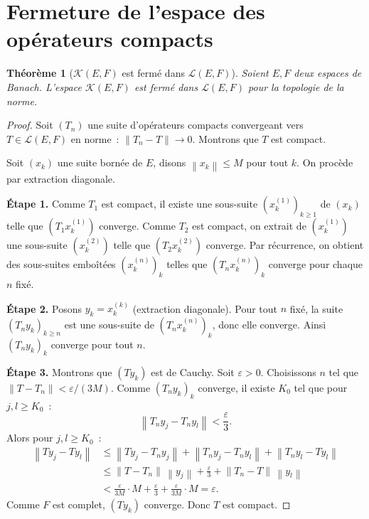 \documentclass[a4paper,12pt]{book}
\newcommand{\norm}[1]{\left\| #1 \right\|}
\theoremstyle{definition}
\theoremstyle{plain}
\newtheorem{theoreme}[definition]{Théorème}
\theoremstyle{remark}
\begin{document}
\section{Fermeture de l'espace des opérateurs compacts}

\begin{theoreme}[{$\mathcal{K}(E,F)$ est fermé dans $\mathcal{L}(E,F)$}]
\label{thm:compact-ferme}
Soient $E, F$ deux espaces de Banach. L'espace $\mathcal{K}(E,F)$ est fermé dans
$\mathcal{L}(E,F)$ pour la topologie de la norme.
\end{theoreme}

\begin{proof}
Soit $(T_n)$ une suite d'opérateurs compacts convergeant vers $T \in \mathcal{L}(E,F)$
en norme~: $\norm{T_n - T} \to 0$. Montrons que $T$ est compact.

Soit $(x_k)$ une suite bornée de $E$, disons $\norm{x_k} \le M$ pour tout $k$. On
procède par extraction diagonale.

\textbf{Étape 1.} Comme $T_1$ est compact, il existe une sous-suite
$(x^{(1)}_k)_{k \ge 1}$ de $(x_k)$ telle que $(T_1 x^{(1)}_k)$ converge. Comme $T_2$
est compact, on extrait de $(x^{(1)}_k)$ une sous-suite $(x^{(2)}_k)$ telle que
$(T_2 x^{(2)}_k)$ converge. Par récurrence, on obtient des sous-suites emboîtées
$(x^{(n)}_k)_k$ telles que $(T_n x^{(n)}_k)_k$ converge pour chaque $n$ fixé.

\textbf{Étape 2.} Posons $y_k = x^{(k)}_k$ (extraction diagonale). Pour tout $n$ fixé,
la suite $(T_n y_k)_{k \ge n}$ est une sous-suite de $(T_n x^{(n)}_k)_k$, donc elle
converge. Ainsi $(T_n y_k)_k$ converge pour tout $n$.

\textbf{Étape 3.} Montrons que $(Ty_k)$ est de Cauchy. Soit $\varepsilon > 0$.
Choisissons $n$ tel que $\norm{T - T_n} < \varepsilon/(3M)$. Comme $(T_n y_k)_k$
converge, il existe $K_0$ tel que pour $j, l \ge K_0$~:
\[
  \norm{T_n y_j - T_n y_l} < \frac{\varepsilon}{3}.
\]
Alors pour $j, l \ge K_0$~:
\begin{align*}
  \norm{Ty_j - Ty_l}
    &\le \norm{Ty_j - T_n y_j} + \norm{T_n y_j - T_n y_l} + \norm{T_n y_l - Ty_l} \\
    &\le \norm{T - T_n}\,\norm{y_j} + \frac{\varepsilon}{3} + \norm{T_n - T}\,\norm{y_l}\\
    &< \frac{\varepsilon}{3M}\cdot M + \frac{\varepsilon}{3} + \frac{\varepsilon}{3M}
       \cdot M = \varepsilon.
\end{align*}
Comme $F$ est complet, $(Ty_k)$ converge. Donc $T$ est compact.
\end{proof}
\end{document}
